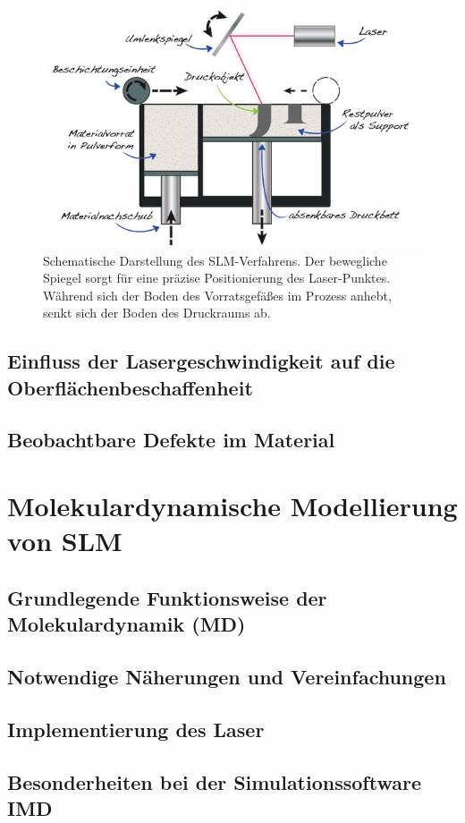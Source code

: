		\begin{figure}[ht]
			\centering
			\includegraphics[width=\textwidth]{chapter/main/img/SLS_SLM.png}
			\caption[Schematische Darstellung des SLM-Verfahrens]{Schematische Darstellung
			des SLM-Verfahrens. Der bewegliche Spiegel sorgt für eine präzise Positionierung
			des Laser-Punktes. Während sich der Boden des Vorrats\-gefäßes im Prozess anhebt,
			senkt sich der Boden des Druckraums ab. \cite[S. 119]{horsch20143d}}
			\label{fig:slm_sls}
		\end{figure}

	\subsection{Einfluss der Lasergeschwindigkeit auf die Oberflächenbeschaffenheit}
	\subsection{Beobachtbare Defekte im Material}


\section{Molekulardynamische Modellierung von SLM}
	\subsection{Grundlegende Funktionsweise der Molekulardynamik (MD)}
	\subsection{Notwendige Näherungen und Vereinfachungen}
	\subsection{Implementierung des Laser}
	\subsection{Besonderheiten bei der Simulationssoftware IMD}
